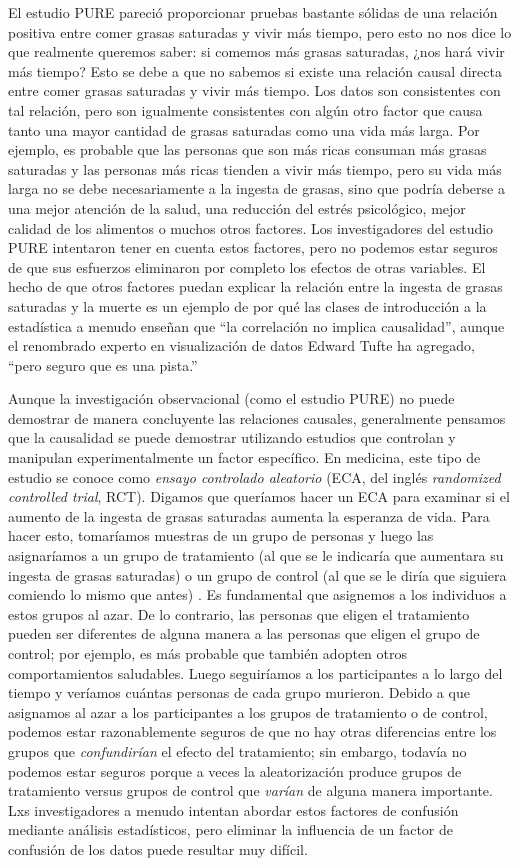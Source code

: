 \documentclass[
  12pt,
]{book}
\begin{document}
El estudio PURE pareció proporcionar pruebas bastante sólidas de una relación positiva entre comer grasas saturadas y vivir más tiempo, pero esto no nos dice lo que realmente queremos saber: si comemos más grasas saturadas, ¿nos hará vivir más tiempo? Esto se debe a que no sabemos si existe una relación causal directa entre comer grasas saturadas y vivir más tiempo. Los datos son consistentes con tal relación, pero son igualmente consistentes con algún otro factor que causa tanto una mayor cantidad de grasas saturadas como una vida más larga. Por ejemplo, es probable que las personas que son más ricas consuman más grasas saturadas y las personas más ricas tienden a vivir más tiempo, pero su vida más larga no se debe necesariamente a la ingesta de grasas, sino que podría deberse a una mejor atención de la salud, una reducción del estrés psicológico, mejor calidad de los alimentos o muchos otros factores. Los investigadores del estudio PURE intentaron tener en cuenta estos factores, pero no podemos estar seguros de que sus esfuerzos eliminaron por completo los efectos de otras variables. El hecho de que otros factores puedan explicar la relación entre la ingesta de grasas saturadas y la muerte es un ejemplo de por qué las clases de introducción a la estadística a menudo enseñan que ``la correlación no implica causalidad'', aunque el renombrado experto en visualización de datos Edward Tufte ha agregado, ``pero seguro que es una pista.''

Aunque la investigación observacional (como el estudio PURE) no puede demostrar de manera concluyente las relaciones causales, generalmente pensamos que la causalidad se puede demostrar utilizando estudios que controlan y manipulan experimentalmente un factor específico. En medicina, este tipo de estudio se conoce como \emph{ensayo controlado aleatorio} (ECA, del inglés \emph{randomized controlled trial}, RCT). Digamos que queríamos hacer un ECA para examinar si el aumento de la ingesta de grasas saturadas aumenta la esperanza de vida. Para hacer esto, tomaríamos muestras de un grupo de personas y luego las asignaríamos a un grupo de tratamiento (al que se le indicaría que aumentara su ingesta de grasas saturadas) o un grupo de control (al que se le diría que siguiera comiendo lo mismo que antes) . Es fundamental que asignemos a los individuos a estos grupos al azar. De lo contrario, las personas que eligen el tratamiento pueden ser diferentes de alguna manera a las personas que eligen el grupo de control; por ejemplo, es más probable que también adopten otros comportamientos saludables. Luego seguiríamos a los participantes a lo largo del tiempo y veríamos cuántas personas de cada grupo murieron. Debido a que asignamos al azar a los participantes a los grupos de tratamiento o de control, podemos estar razonablemente seguros de que no hay otras diferencias entre los grupos que \emph{confundirían} el efecto del tratamiento; sin embargo, todavía no podemos estar seguros porque a veces la aleatorización produce grupos de tratamiento versus grupos de control que \emph{varían} de alguna manera importante. Lxs investigadores a menudo intentan abordar estos factores de confusión mediante análisis estadísticos, pero eliminar la influencia de un factor de confusión de los datos puede resultar muy difícil.
\end{document}
